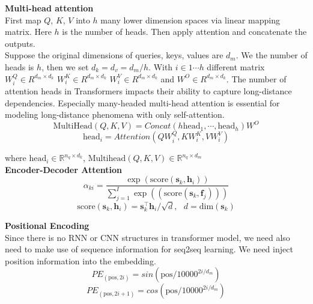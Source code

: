 \textbf{Multi-head attention}\\
 First map $Q$, $K$, $V$ into $h$ many lower dimension spaces via linear mapping matrix. Here $h$ is the number of heads. Then apply attention and concatenate the outputs. \\
Suppose the original dimensions of queries, keys, values are ${d_{m}}$. We the number of heads is ${h}$, then we set ${d_k = d_v = d_{m}/h}$. With ${i \in 1 \cdots h}$ different matrix ${W_i^Q \in R^{d_{m}\times d_k}}$ ${W_i^K \in R^{d_{m}\times d_k}}$ ${W_i^V \in R^{d_{m}\times d_k}}$ and ${W^O \in R^{d_{m}\times d_k}}$.
The number of attention heads in Transformers impacts their ability to capture long-distance dependencies. Especially many-headed multi-head attention is essential for modeling long-distance phenomena with only self-attention.
\[ \text{MultiHead}(Q, K, V) = Concat(h\text{head}_1, \cdots, \text{head}_h)W^O \]
\[\text{head}_i = Attention(QW_i^Q, KW_i^K, VW_i^V) \]

where  $\text{head}_i \in \mathbb{R}^{n_q \times d_k}$,  ${\text{Multihead}(Q,K,V) \in \mathbb{R}^{n_q \times d_m}}$\\

\textbf{Encoder-Decoder Attention}
\[ \alpha_{ki} = \frac{\exp(\text{score}(\bm{s}_k, \bm{h}_i))}{\sum_{j=1}^{I} \exp((\text{score}(\bm{s}_k, \bm{f}_j)))}\]
\[ \text{score}(\bm{s}_k, \bm{h}_i) = \bm{s}_k^\top \bm{h}_i/\sqrt{d}, \ \ \ d= \text{dim}(\bm{s}_k)\]


\textbf{Positional Encoding}\\
Since there is no RNN or CNN structures in transformer model, we need also need to make use of sequence information for seq2seq learning. We need inject position information into the embedding.
\[PE_{(\text{pos}, 2i)} = sin(\text{pos}/ 10000 ^{2i / d_{m}})\]
\[ PE_{(\text{pos}, 2i+1)} = cos(\text{pos} / 10000^{2i/d_{m}})\]


